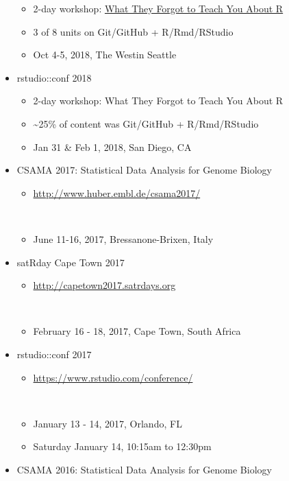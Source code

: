 \documentclass[
]{book}
\providecommand{\tightlist}{%
  \setlength{\itemsep}{0pt}\setlength{\parskip}{0pt}}
\begin{document}
\begin{itemize}
  \begin{itemize}
  \tightlist
  \item
    2-day workshop: \href{https://whattheyforgot.org/index.html\#seattle-2018-october-4-5}{What They Forgot to Teach You About R}\\
  \item
    3 of 8 units on Git/GitHub + R/Rmd/RStudio\\
  \item
    Oct 4-5, 2018, The Westin Seattle
  \end{itemize}
\item
  rstudio::conf 2018

  \begin{itemize}
  \tightlist
  \item
    2-day workshop: What They Forgot to Teach You About R\\
  \item
    \textasciitilde25\% of content was Git/GitHub + R/Rmd/RStudio\\
  \item
    Jan 31 \& Feb 1, 2018, San Diego, CA
  \end{itemize}
\item
  CSAMA 2017: Statistical Data Analysis for Genome Biology

  \begin{itemize}
  \tightlist
  \item
    \url{http://www.huber.embl.de/csama2017/}\strut \\
  \item
    June 11-16, 2017, Bressanone-Brixen, Italy\\
  \end{itemize}
\item
  satRday Cape Town 2017

  \begin{itemize}
  \tightlist
  \item
    \url{http://capetown2017.satrdays.org}\strut \\
  \item
    February 16 - 18, 2017, Cape Town, South Africa
  \end{itemize}
\item
  rstudio::conf 2017

  \begin{itemize}
  \tightlist
  \item
    \url{https://www.rstudio.com/conference/}\strut \\
  \item
    January 13 - 14, 2017, Orlando, FL\\
  \item
    Saturday January 14, 10:15am to 12:30pm
  \end{itemize}
\item
  CSAMA 2016: Statistical Data Analysis for Genome Biology


\end{itemize}
\end{document}
